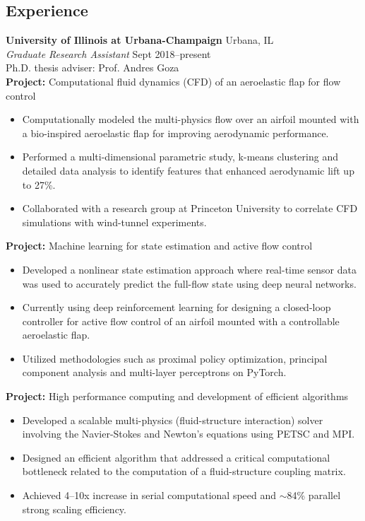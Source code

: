 \documentclass[margin]{res}
\begin{document}
\begin{resume}
\section{\large Experience}
{\bf University of Illinois at Urbana-Champaign} \hfill Urbana, IL \\
{\it Graduate Research Assistant} \hfill Sept 2018--present\\
Ph.D. thesis adviser: Prof. Andres Goza \\
%
{\textbf{Project:} Computational fluid dynamics (CFD) of an aeroelastic flap for flow control}
\begin{itemize}
	\item Computationally modeled the multi-physics flow over an airfoil mounted with a bio-inspired aeroelastic flap for improving aerodynamic performance.
	\item Performed a multi-dimensional parametric study, k-means clustering and detailed data analysis to identify features that enhanced aerodynamic lift up to 27\%.
	\item Collaborated with a research group at Princeton University to correlate CFD simulations with wind-tunnel experiments.
\end{itemize}

{\textbf{Project:}  Machine learning for state estimation and active flow control}
\begin{itemize}
	\item Developed a nonlinear state estimation approach where real-time sensor data was used to accurately predict the full-flow state using deep neural networks.
	\item Currently using deep reinforcement learning for designing a closed-loop controller for active flow control of an airfoil mounted with a controllable aeroelastic flap.
	\item Utilized methodologies such as proximal policy optimization, principal component analysis and multi-layer perceptrons on PyTorch.
\end{itemize}

{\textbf{Project:}  High performance computing and development of efficient algorithms}
\begin{itemize}
	\item Developed a scalable multi-physics (fluid-structure interaction) solver involving the Navier-Stokes and Newton's equations using PETSC and MPI. 
	\item Designed an efficient algorithm that addressed a critical computational bottleneck related to the computation of a fluid-structure coupling matrix.
	\item Achieved 4--10x increase in serial computational speed and $\sim$84\% parallel strong scaling efficiency.
\end{itemize}


\end{resume}
\end{document}
